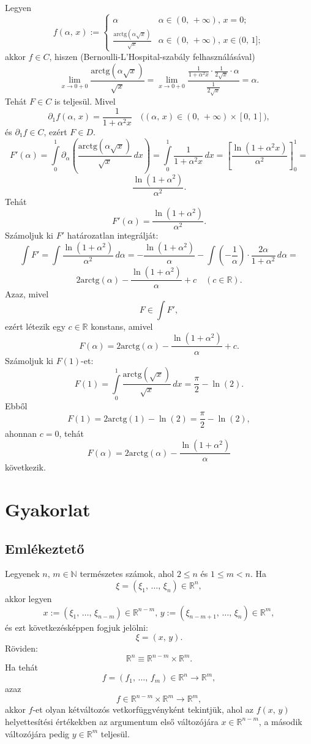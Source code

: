\documentclass{article}
\newcommand{\R}{\mathbb{R}}
\newcommand{\N}{\mathbb{N}}
\begin{document}
	Legyen
	\[
		f(\alpha, \, x) := \begin{cases}
			\alpha & \alpha \in (0, \, + \infty), \, x = 0; \\
			\frac{\text{arctg}(\alpha \sqrt{x})}{\sqrt{x}} & \alpha \in (0, \, + \infty), \, x \in (0, \, 1];
		\end{cases}
	\]
	akkor $f \in C$, hiszen (Bernoulli-L'Hospital-szabály felhasználásával)
	\[
		\lim_{x \to 0 + 0} \frac{\text{arctg}(\alpha\sqrt{x})}{\sqrt{x}} = \lim_{x \to 0 + 0} \frac{\frac{1}{1 + \alpha^2 x} \cdot \frac{1}{2\sqrt{x}} \cdot \alpha}{\frac{1}{2\sqrt{x}}} = \alpha.
	\]
	Tehát $F \in C$ is teljesül. Mivel
	\[
		\partial_1 f(\alpha, \, x) = \frac{1}{1+ \alpha^2x} \quad \big( (\alpha, \, x) \in (0, \, + \infty) \times [0, \, 1] \big),
	\]
	és $\partial_1 f \in C$, ezért $F \in D$.
	\[
		F'(\alpha)= \int\limits_0^1 \partial_\alpha \left( \frac{\text{arctg}(\alpha \sqrt{x})}{\sqrt{x}} \, dx \right) = \int\limits_0^1 \frac{1}{1+\alpha^2 x} \, dx = \left[ \frac{\ln(1+\alpha^2x)}{\alpha^2} \right]_0^1 =
	\]
	\[
		\frac{\ln(1+\alpha^2)}{\alpha^2}.
	\]
	Tehát
	\[
		F'(\alpha) = \frac{\ln(1+\alpha^2)}{\alpha^2}.
	\]
	Számoljuk ki $F'$ határozatlan integrálját:
	\[
		\int F' = \int \frac{\ln(1+\alpha^2)}{\alpha^2} \, d\alpha = -\frac{\ln(1+\alpha^2)}{\alpha} - \int \left(-\frac{1}{\alpha}\right) \cdot \frac{2\alpha}{1 + \alpha^2} \, d\alpha =
	\]
	\[
		2 \text{arctg}(\alpha) - \frac{\ln(1+\alpha^2)}{\alpha} + c \quad (c \in \R).
	\]
	Azaz, mivel
	\[
		F \in \int F',
	\]
	ezért létezik egy $c \in \R$ konstans, amivel
	\[
		F(\alpha) = 2 \text{arctg}(\alpha) - \frac{\ln(1+\alpha^2)}{\alpha} + c.
	\]
	Számoljuk ki $F(1)$-et:
	\[
		F(1) = \int\limits_0^1 \frac{\text{arctg}(\sqrt{x})}{\sqrt{x}} \, dx = \frac{\pi}{2} - \ln(2).
	\]
	Ebből
	\[
		F(1) = 2 \text{arctg}(1) - \ln(2) = \frac{\pi}{2} - \ln(2),
	\]
	ahonnan $c=0$, tehát
	\[
		F(\alpha) = 2 \text{arctg}(\alpha) - \frac{\ln(1+\alpha^2)}{\alpha}
	\]
	következik.



	\newpage
	\section{Gyakorlat}
	\subsection{Emlékeztető}

	Legyenek $n, \, m \in \N$ természetes számok, ahol $2 \leq n$ és $1 \leq m < n$. Ha
	\[
		\xi = (\xi_1, \, \dots, \, \xi_n) \in \R^n,
	\]
	akkor legyen
	\[
		x := (\xi_1, \, \dots, \, \xi_{n-m}) \in \R^{n-m}, \, y := (\xi_{n-m+1}, \, \dots, \, \xi_n) \in \R^m,
	\]
	és ezt következésképpen fogjuk jelölni:
	\[
		\xi =(x, \, y).
	\]
	Röviden:
	\[
		\R^n \equiv \R^{n-m} \times \R^m.
	\]
	Ha tehát
	\[
		f = (f_1, \, \dots, \, f_m) \in \R^n \to \R^m,
	\]
	azaz
	\[
		f \in \R^{n-m} \times \R^m \to \R^m,
	\]
	akkor $f$-et olyan kétváltozós vetkorfüggvényként tekintjük, ahol az $f(x, \, y)$ helyettesítési értékekben az argumentum első változójára $x \in \R^{n-m}$, a második változójára pedig $y \in \R^m$ teljesül.\\
\end{document}
